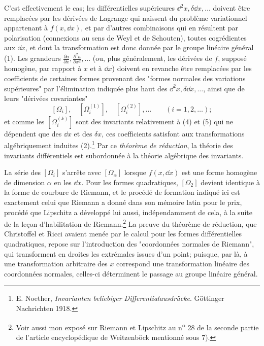 C'est effectivement le cas; les différentielles supérieures $\dd^2x,\delta\dd x,\ldots$ doivent être remplacées par les dérivées de Lagrange qui naissent du problème variationnel appartenant à $f(x,\dd x)$, et par d'autres combinaisons qui en résultent par polarisation (connexions au sens de Weyl et de Schouten), toutes cogrédientes aux $\dd x$, et dont la transformation est donc donnée par le groupe linéaire général (1). Les grandeurs $\frac{\partial a}{\partial x},\frac{\partial^2a}{\partial x^2},\ldots$ (ou, plus généralement, les dérivées de $f$, supposé homogène, par rapport à $x$ et à $\dd x$) doivent en revanche être remplacées par les coefficients de certaines formes provenant des "formes normales des variations supérieures" par l'élimination indiquée plus haut des $\dd^2x,\delta\dd x,\ldots$, ainsi que de leurs "dérivées covariantes"
\[
 [\Omega_i],\quad [\Omega_i^{(1)}],\quad [\Omega_i^{(2)}],\ldots\qquad (i=1,2,\ldots);
\]
et comme les $[\Omega_i^{(k)}]$ sont des invariants relativement à (4) et (5) qui ne dépendent que des $\dd x$ et des $\delta x$, ces coefficients satisfont aux transformations algébriquement induites (2).\footnote{E. Noether, \emph{Invarianten beliebiger Differentialausdrücke}. Göttinger Nachrichten 1918.} Par ce \emph{théorème de réduction}, la théorie des invariants différentiels est subordonnée à la théorie algébrique des invariants.

La série des $[\Omega_i]$ s'arrête avec $[\Omega_\alpha]$ lorsque $f(x,\dd x)$ est une forme homogène de dimension $\alpha$ en les $\dd x$. Pour les formes quadratiques, $[\Omega_2]$ devient identique à la forme de courbure de Riemann, et le procédé de formation indiqué ici est exactement celui que Riemann a donné dans son mémoire latin pour le prix, procédé que Lipschitz a développé lui aussi, indépendamment de cela, à la suite de la leçon d'habilitation de Riemann.\footnote{Voir aussi mon exposé sur Riemann et Lipschitz au n\textsuperscript{o} 28 de la seconde partie de l'article encyclopédique de Weitzenböck mentionné sous 7).} La preuve du théorème de réduction, que Christoffel et Ricci avaient menée par le calcul pour les formes différentielles quadratiques, repose sur l'introduction des "coordonnées normales de Riemann", qui transforment en droites les extrémales issues d'un point; puisque, par là, à une transformation arbitraire des $x$ correspond une transformation linéaire des coordonnées normales, celles-ci déterminent le passage au groupe linéaire général.

